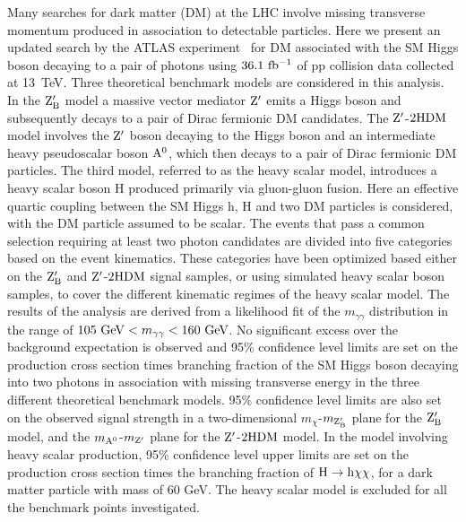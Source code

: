 \documentclass[10pt]{article}
\begin{document}
Many searches for dark matter (DM) at the LHC involve missing transverse momentum
produced in association to detectable particles. Here we present an updated search
by the ATLAS experiment~\cite{Aaboud:2017uak} for DM associated with the SM
Higgs boson decaying to a pair of photons using $36.1~{\rm fb^{-1}}$ of pp
collision data collected at 13~TeV. Three theoretical benchmark models are
considered in this analysis. In the ${\rm Z_{B}'}$ model a massive vector
mediator ${\rm Z'}$ emits a Higgs boson and subsequently decays to a pair of Dirac
fermionic DM candidates.
The ${\rm Z'}$-${\rm 2HDM}$ model involves the ${\rm Z'}$ boson decaying
to the Higgs boson and an intermediate heavy pseudoscalar boson ${\rm A^{0}}$,
which then decays to a pair of Dirac fermionic DM particles. The third model,
referred to as the heavy scalar model, introduces a heavy scalar boson H
produced primarily via gluon-gluon fusion. Here an effective quartic coupling
between the SM Higgs h, H and two DM particles is considered, with the DM
particle assumed to be scalar. The events that pass a common selection requiring
at least two photon candidates are divided into five categories based on the
event kinematics. These categories have been optimized based either on the ${\rm Z_{B}'}$
and ${\rm Z'}$-${\rm 2HDM}$ signal samples, or using simulated heavy scalar
boson samples, to cover the different kinematic regimes of the heavy scalar
model. The results of the analysis are derived from a likelihood fit of the
$m_{\gamma\gamma}$ distribution in the range of
$105~{\rm GeV} < m_{\gamma\gamma} < 160~{\rm GeV}$.
No significant excess over
the background expectation is observed and 95\% confidence level limits are set
on the production cross section times branching fraction of the SM Higgs boson
decaying into two photons in association with missing transverse energy in the
three different theoretical benchmark models. 95\% confidence level limits are
also set on the observed signal strength in a two-dimensional
$m_{\chi}$-$m_{\rm Z_{B}'}$ plane for the ${\rm Z_{B}'}$ model, and the
$m_{\rm A^0}$-$m_{\rm Z'}$ plane for the ${\rm Z'}$-${\rm 2HDM}$ model. In the
model involving heavy scalar production, 95\% confidence level upper limits are
set on the production cross section times the branching fraction of
${\rm H}\to{\rm h}\chi\chi$, for a dark matter
particle with mass of 60 GeV. The heavy scalar model is excluded for all the
benchmark points investigated.
\end{document}
